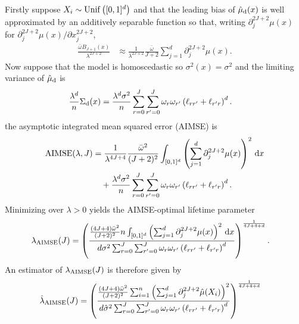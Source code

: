 Firstly suppose $X_i \sim \operatorname{Unif}\big([0,1]^d\big)$
and that the leading bias of $\hat\mu_{\mathrm{d}}(x)$ is well approximated by an
additively separable function so that,
writing $\partial^{2 J + 2}_j \mu(x)$
for $\partial^{2 J + 2}_j \mu(x) / \partial x_j^{2 J + 2}$,
%
\begin{align*}
  \frac{\bar \omega B_{J+1}(x)}{\lambda^{2 J + 2}}
  &\approx
  \frac{1}{\lambda^{2 J + 2}}
  \frac{\bar \omega }{J + 2}
  \sum_{j=1}^d
  \partial^{2 J + 2}_j \mu(x).
\end{align*}
%
Now suppose that the model is homoscedastic so
$\sigma^2(x) = \sigma^2$ and
the limiting variance of $\hat\mu_{\mathrm{d}}$ is
%
\begin{align*}
  \frac{\lambda^d}{n}
  \Sigma_{\mathrm{d}}(x)
  &=
  \frac{\lambda^d \sigma^2}{n}
  \sum_{r=0}^{J}
  \sum_{r'=0}^{J}
  \omega_r
  \omega_{r'}
  \left( \ell_{r r'} + \ell_{r' r} \right)^d.
\end{align*}
%
the asymptotic integrated mean squared error (AIMSE) is
%
\begin{align*}
  \operatorname{AIMSE}(\lambda, J)
  &=
  \frac{1}{\lambda^{4 J + 4}}
  \frac{\bar \omega^2}{(J + 2)^2}
  \int_{[0,1]^d}
  \left(
    \sum_{j=1}^d
    \partial^{2 J + 2}_j \mu(x)
  \right)^2
  \,\mathrm{d}x \\
  &\quad+
  \frac{\lambda^d \sigma^2}{n}
  \sum_{r=0}^{J}
  \sum_{r'=0}^{J}
  \omega_r
  \omega_{r'}
  \left( \ell_{r r'} + \ell_{r' r} \right)^d.
\end{align*}
%
Minimizing over $\lambda > 0$ yields the AIMSE-optimal lifetime parameter
%
\begin{align*}
  \lambda_{\operatorname{AIMSE}}(J)
  &=
  \left(
    \frac{
      \frac{(4 J + 4) \bar \omega^2}{(J + 2)^2}
      n \int_{[0,1]^d}
      \left(
        \sum_{j=1}^d
        \partial^{2 J + 2}_j \mu(x)
      \right)^2
      \,\mathrm{d}x
    }{
      d \sigma^2
      \sum_{r=0}^{J}
      \sum_{r'=0}^{J}
      \omega_r
      \omega_{r'}
      \left( \ell_{r r'} + \ell_{r' r} \right)^d
    }
  \right)^{\frac{1}{4 J + 4 + d}}.
\end{align*}
%
An estimator of $\lambda_{\operatorname{AIMSE}}(J)$ is therefore given by
%
\begin{align*}
  \hat\lambda_{\operatorname{AIMSE}}(J)
  &=
  \left(
    \frac{
      \frac{(4 J + 4) \bar \omega^2}{(J + 2)^2}
      \sum_{i=1}^n
      \left(
        \sum_{j=1}^d
        \partial^{2 J + 2}_j \hat\mu(X_i)
      \right)^2
    }{
      d \hat\sigma^2
      \sum_{r=0}^{J}
      \sum_{r'=0}^{J}
      \omega_r
      \omega_{r'}
      \left( \ell_{r r'} + \ell_{r' r} \right)^d
    }
  \right)^{\frac{1}{4 J + 4 + d}}
\end{align*}
